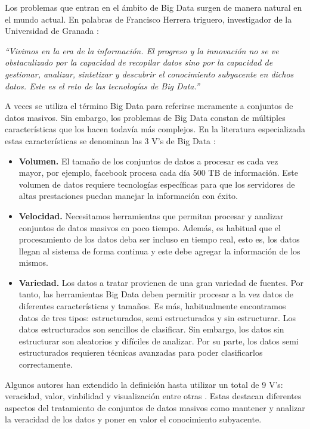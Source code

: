 \documentclass[10pt]{article}
\begin{document}
	Los problemas que entran en el ámbito de Big Data surgen de manera natural en el mundo actual. En palabras de Francisco Herrera triguero, investigador de la Universidad de Granada  \cite{big-data-herrera}:
	
	\textit{``Vivimos en la era de la información. El progreso y la innovación no se ve obstaculizado por la capacidad de recopilar datos sino por la capacidad de gestionar, analizar, sintetizar y descubrir el conocimiento subyacente en dichos datos. Este es el reto de las tecnologías de Big Data.''}
	
	A veces se utiliza el término Big Data para referirse meramente a conjuntos de datos masivos. Sin embargo, los problemas de Big Data constan de múltiples características que los hacen todavía más complejos. En la literatura especializada estas características se denominan las 3 V's de Big Data \cite{big-data}:

	\begin{itemize}
		\item \textbf{Volumen.} El tamaño de los conjuntos de datos a procesar es cada vez mayor, por ejemplo, facebook procesa cada día 500 TB de información. Este volumen de datos requiere tecnologías específicas para que los servidores de altas prestaciones puedan manejar la información con éxito.
		\item \textbf{Velocidad.} Necesitamos herramientas que permitan procesar y analizar conjuntos de datos masivos en poco tiempo. Además, es habitual que el procesamiento de los datos deba ser incluso en tiempo real, esto es, los datos llegan al sistema de forma continua y este debe agregar la información de los mismos.
		\item \textbf{Variedad.} Los datos a tratar provienen de una gran variedad de fuentes. Por tanto, las herramientas Big Data deben permitir procesar a la vez datos de diferentes características y tamaños. Es más, habitualmente encontramos datos de tres tipos: estructurados, semi estructurados y sin estructurar. Los datos estructurados son sencillos de clasificar. Sin embargo, los datos sin estructurar son aleatorios y difíciles de analizar. Por su parte, los datos semi estructurados requieren técnicas avanzadas para poder clasificarlos correctamente.
	\end{itemize}

	Algunos autores han extendido la definición hasta utilizar un total de 9 V's: veracidad, valor, viabilidad y visualización entre otras \cite{understanding-big-data}. Estas destacan diferentes aspectos del tratamiento de conjuntos de datos masivos como mantener y analizar la veracidad de los datos y poner en valor el conocimiento subyacente.
\end{document}

